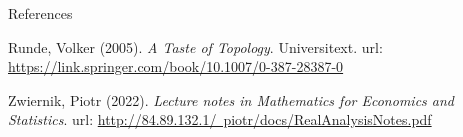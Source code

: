 \documentclass [aspectratio=169]{beamer}
\begin{document}
\begin{frame}{References}

Runde, Volker (2005). \textit{A Taste of Topology}. Universitext.  url:  \href{https://link.springer.com/book/10.1007/0-387-28387-0}{https://link.springer.com/book/10.1007/0-387-28387-0} 

\vspace{1em}

Zwiernik, Piotr (2022). \textit{Lecture notes in Mathematics for Economics and Statistics}. url: \href{http://84.89.132.1/~piotr/docs/RealAnalysisNotes.pdf}{http://84.89.132.1/~piotr/docs/RealAnalysisNotes.pdf} \\

\end{frame}
\end{document}
